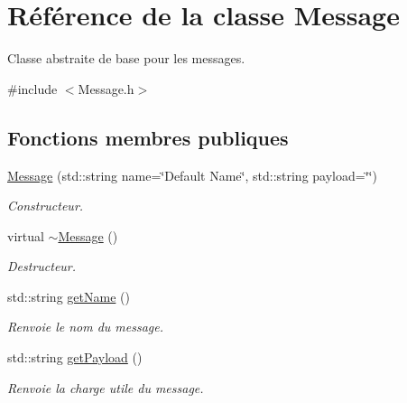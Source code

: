 \hypertarget{classMessage}{\section{Référence de la classe Message}
\label{classMessage}
}


Classe abstraite de base pour les messages.  




{\ttfamily \#include $<$Message.\-h$>$}

\subsection*{Fonctions membres publiques}
\begin{DoxyCompactItemize}
\item 
\hypertarget{classMessage_ad34376a89dbca320ab351c6110cfb3cb}{\hyperlink{classMessage_ad34376a89dbca320ab351c6110cfb3cb}{Message} (std\-::string name=\char`\"{}Default Name\char`\"{}, std\-::string payload=\char`\"{}\char`\"{})}\label{classMessage_ad34376a89dbca320ab351c6110cfb3cb}

\begin{DoxyCompactList}\small\item\em Constructeur. \end{DoxyCompactList}\item 
\hypertarget{classMessage_a3f7275462831f787a861271687bcad67}{virtual \hyperlink{classMessage_a3f7275462831f787a861271687bcad67}{$\sim$\-Message} ()}\label{classMessage_a3f7275462831f787a861271687bcad67}

\begin{DoxyCompactList}\small\item\em Destructeur. \end{DoxyCompactList}\item 
\hypertarget{classMessage_ac03b02000572b0852c574498bf138e87}{std\-::string \hyperlink{classMessage_ac03b02000572b0852c574498bf138e87}{get\-Name} ()}\label{classMessage_ac03b02000572b0852c574498bf138e87}

\begin{DoxyCompactList}\small\item\em Renvoie le nom du message. \end{DoxyCompactList}\item 
\hypertarget{classMessage_ad4276fb8ec3b78e30b13cd13a242b163}{std\-::string \hyperlink{classMessage_ad4276fb8ec3b78e30b13cd13a242b163}{get\-Payload} ()}\label{classMessage_ad4276fb8ec3b78e30b13cd13a242b163}

\begin{DoxyCompactList}\small\item\em Renvoie la charge utile du message. \end{DoxyCompactList}\end{DoxyCompactItemize}


